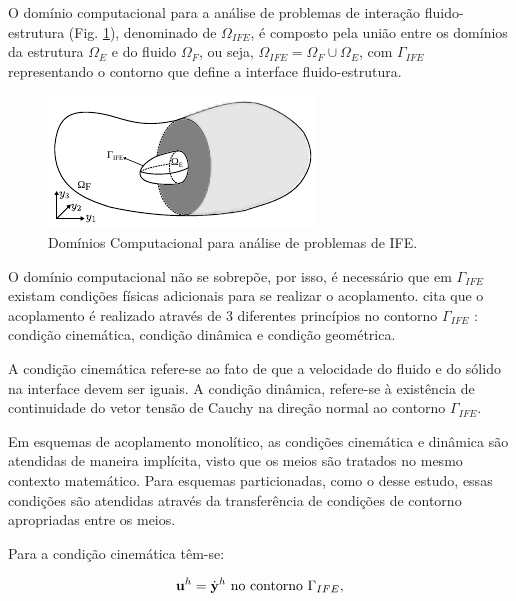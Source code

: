 \documentclass[tese_patricia]{subfiles}
\begin{document}
O domínio computacional para a análise de problemas de interação fluido-estrutura (Fig. \ref{fig:dominios}), denominado de $\Omega_{IFE}$, é composto pela união entre os domínios da estrutura $\Omega_E$ e do fluido $\Omega_F$, ou seja, $\Omega_{IFE} = \Omega_F \cup \Omega_E$, com $\Gamma_{IFE}$ representando o contorno que define a interface fluido-estrutura.

\begin{figure}[htb!]
	\centering 
	\includegraphics[scale=2.0,trim=0cm 0cm 0cm 0.0cm, clip=true]{Imagens/Cap7/dominio.pdf}	
	\caption{Domínios Computacional para análise de problemas de IFE.}
	\label{fig:dominios}
\end{figure}

O domínio computacional não se sobrepõe, por isso, é necessário que em $\Gamma_{IFE}$ existam condições físicas adicionais para se realizar o acoplamento.  cita que o acoplamento é realizado através de 3 diferentes princípios no contorno $\Gamma_{IFE}$ : condição cinemática, condição dinâmica e condição geométrica.

A condição cinemática refere-se ao fato de que a velocidade do fluido e do sólido na interface devem ser iguais. A condição dinâmica, refere-se à existência de continuidade do vetor tensão de Cauchy na direção normal ao contorno $\Gamma_{IFE}$.

Em esquemas de acoplamento monolítico, as condições cinemática e dinâmica são atendidas de maneira implícita, visto que os meios são tratados no mesmo contexto matemático. Para esquemas particionadas, como o desse estudo, essas condições são atendidas através da transferência de condições de contorno apropriadas entre os meios.

Para a condição cinemática têm-se:

\begin{align}
	\mathbf{u}^h = \dot{\mathbf{y}}^h \ \textrm{no contorno} \ \Gamma_{IFE},
\end{align}
\end{document}
